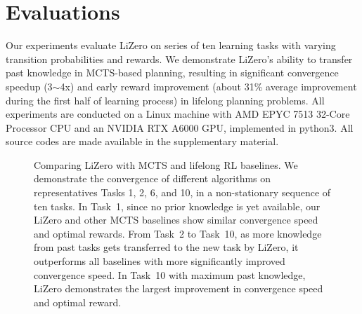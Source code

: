 \section{Evaluations}
\label{sec:eval}
Our experiments evaluate LiZero on series of ten learning tasks with varying transition probabilities and rewards. We demonstrate LiZero's ability to transfer past knowledge in MCTS-based planning, resulting in significant convergence speedup (3$\sim$4x) and early reward improvement (about 31\% average improvement during the first half of learning process) in lifelong planning problems.
All experiments are conducted on a Linux machine with AMD EPYC 7513 32-Core Processor CPU and an NVIDIA RTX A6000 GPU, implemented in python3.
All source codes are made available in the supplementary material.


\begin{figure*}[h]
\centering

  \hfill
  \hfill
  \hfill
  \hfill
  \vspace{-0.15in}
  \caption{
  Comparing LiZero with MCTS and lifelong RL baselines. We demonstrate the convergence of different algorithms on representatives Tasks 1, 2, 6, and 10, in a non-stationary sequence of ten tasks. In Task~1, since no prior knowledge is yet available, our LiZero and other MCTS baselines show similar convergence speed and optimal rewards. From Task~2 to Task~10, as more knowledge from past tasks gets transferred to the new task by LiZero, it outperforms all baselines with more significantly improved convergence speed. In Task~10 with maximum past knowledge, LiZero demonstrates the largest improvement in convergence speed and optimal reward.
  }
  \label{fig:task}
\end{figure*}







